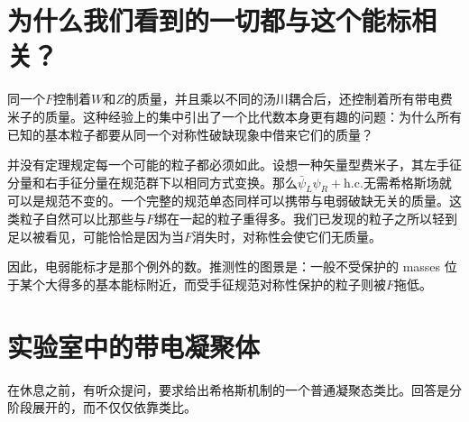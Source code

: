 \section{为什么我们看到的一切都与这个能标相关？}

同一个\(F\)控制着\(W\)和\(Z\)的质量，并且乘以不同的汤川耦合后，还控制着所有带电费米子的质量。这种经验上的集中引出了一个比代数本身更有趣的问题：为什么所有已知的基本粒子都要从同一个对称性破缺现象中借来它们的质量？

并没有定理规定每一个可能的粒子都必须如此。设想一种矢量型费米子，其左手征分量和右手征分量在规范群下以相同方式变换。那么\(\bar\psi_L\psi_R+\mathrm{h.c.}\)无需希格斯场就可以是规范不变的。一个完整的规范单态同样可以携带与电弱破缺无关的质量。这类粒子自然可以比那些与\(F\)绑在一起的粒子重得多。我们已发现的粒子之所以轻到足以被看见，可能恰恰是因为当\(F\)消失时，对称性会使它们无质量。

因此，电弱能标才是那个例外的数。推测性的图景是：一般不受保护的 masses 位于某个大得多的基本能标附近，而受手征规范对称性保护的粒子则被\(F\)拖低。

\begin{classroomqa}
\end{classroomqa}

\begin{classroomqa}
\end{classroomqa}

\section{实验室中的带电凝聚体}

在休息之前，有听众提问，要求给出希格斯机制的一个普通凝聚态类比。回答是分阶段展开的，而不仅仅依靠类比。

\begin{classroomqa}
\end{classroomqa}

